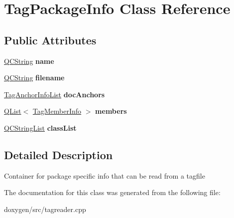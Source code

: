 \hypertarget{class_tag_package_info}{}\section{Tag\+Package\+Info Class Reference}
\label{class_tag_package_info}
\subsection*{Public Attributes}
\begin{DoxyCompactItemize}
\item 
\mbox{\label{class_tag_package_info_a6421c38b37145e1f056b28858a03ed7b}} 
\mbox{\hyperlink{class_q_c_string}{Q\+C\+String}} {\bfseries name}
\item 
\mbox{\label{class_tag_package_info_a33ed62000d0d361828e54115671005c0}} 
\mbox{\hyperlink{class_q_c_string}{Q\+C\+String}} {\bfseries filename}
\item 
\mbox{\label{class_tag_package_info_ae653734354d08bda1b11ea3512456963}} 
\mbox{\hyperlink{class_tag_anchor_info_list}{Tag\+Anchor\+Info\+List}} {\bfseries doc\+Anchors}
\item 
\mbox{\label{class_tag_package_info_addf2e409596c0cf34c5740242977677c}} 
\mbox{\hyperlink{class_q_list}{Q\+List}}$<$ \mbox{\hyperlink{class_tag_member_info}{Tag\+Member\+Info}} $>$ {\bfseries members}
\item 
\mbox{\label{class_tag_package_info_a1bc182d56b478eda4339b060df2943c1}} 
\mbox{\hyperlink{class_q_c_string_list}{Q\+C\+String\+List}} {\bfseries class\+List}
\end{DoxyCompactItemize}


\subsection{Detailed Description}
Container for package specific info that can be read from a tagfile 

The documentation for this class was generated from the following file\+:\begin{DoxyCompactItemize}
\item 
doxygen/src/tagreader.\+cpp\end{DoxyCompactItemize}
